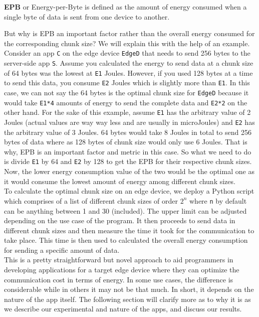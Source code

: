 \begin{definition}
    \textbf{EPB} or Energy-per-Byte is defined as the amount of energy consumed when a single byte of data is sent from one device to another.
\end{definition}

But why is EPB an important factor rather than the overall energy consumed for the corresponding chunk size? 
We will explain this with the help of an example. Consider an app \texttt{C} on the edge device \texttt{EdgeD} that needs 
to send 256 bytes to the server-side app \texttt{S}. Assume you calculated the energy to send data at a 
chunk size of 64 bytes was the lowest at \texttt{E1} Joules. However, if you used 128 bytes at a time to 
send this data, you consume \texttt{E2} Joules which is slightly more than \texttt{E1}. In this case, 
we can not say the 64 bytes is the optimal chunk size for \texttt{EdgeD} because it would take \texttt{E1*4} 
amounts of energy to send the complete data and \texttt{E2*2} on the other hand. For the sake of this 
example, assume \texttt{E1} has the arbitrary value of 2 Joules (actual values are way way less and are usually 
in microJoules) and \texttt{E2} has the arbitrary value of 3 Joules. 64 bytes would take 8 Joules in total 
to send 256 bytes of data where as 128 bytes of chunk size would only use 6 Joules. That is why, EPB is an 
important factor and metric in this case. So what we need to do is divide \texttt{E1} by 64 and \texttt{E2} 
by 128 to get the EPB for their respective chunk sizes. Now, the lower energy consumption value of the 
two would be the optimal one as it would consume the lowest amount of energy among different chunk sizes. \\
To calculate the optimal chunk size on an edge device, we deploy a Python script which comprises of a 
list of different chunk sizes of order \texttt{$2^{n}$} where \texttt{n} by default can be anything between 
1 and 30 (included). The upper limit can be adjusted depending on the use case of the program. It then 
proceeds to send data in different chunk sizes and then measure the time it took for the communication to take 
place. This time is then used to calculated the overall energy consumption for sending a specific amount of 
data. \\
This is a pretty straightforward but novel approach to aid programmers in developing applications for 
a target edge device where they can optimize the communication cost in terms of energy. In some use cases, the 
difference is considerable while in others it may not be that much. In short, it depends on the nature of the app 
itself. The following section will clarify more as to why it is as we describe our experimental and nature of the 
apps, and discuss our results. \\